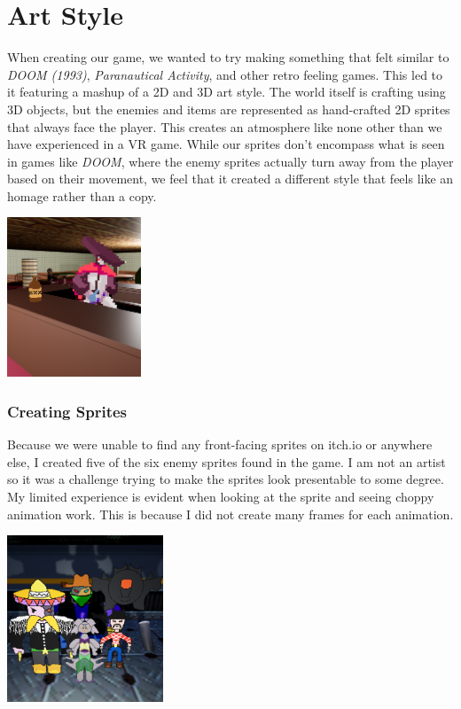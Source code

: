 \documentclass{sigchi}
\begin{document}
\section{Art Style}
When creating our game, we wanted to try making something that felt similar to \textit{DOOM (1993)}, \textit{Paranautical Activity}, and other retro feeling games. This led to it featuring a mashup of a 2D and 3D art style. The world itself is crafting using 3D objects, but the enemies and items are represented as hand-crafted 2D sprites that always face the player. This creates an atmosphere like none other than we have experienced in a VR game. While our sprites don’t encompass what is seen in games like \textit{DOOM}, where the enemy sprites actually turn away from the player based on their movement, we feel that it created a different style that feels like an homage rather than a copy.
\begin{center}
    \includegraphics[width=0.3\textwidth]{2D.png}
    \label{fig:2D}
\end{center}

\subsubsection*{Creating Sprites}
Because we were unable to find any front-facing sprites on itch.io \cite{itch} or anywhere else, I created five of the six enemy sprites found in the game. I am not an artist so it was a challenge trying to make the sprites look presentable to some degree. My limited experience is evident when looking at the sprite and seeing choppy animation work. This is because I did not create many frames for each animation. 
\begin{center}
    \includegraphics[width=0.35\textwidth]{sprite.png}
    \label{fig:Sprites}
\end{center}
\end{document}
